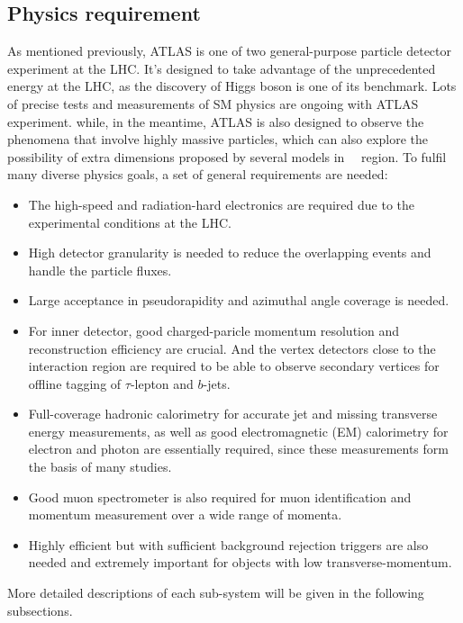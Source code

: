 \subsection{Physics requirement}

As mentioned previously, ATLAS is one of two general-purpose particle detector experiment at the LHC.
It's designed to take advantage of the unprecedented energy at the LHC, as the discovery of Higgs boson is one of its benchmark. 
Lots of precise tests and measurements of SM physics are ongoing with ATLAS experiment.
while, in the meantime, ATLAS is also designed to observe the phenomena that involve highly massive particles,
which can also explore the possibility of extra dimensions proposed by several models in~\tev~ region.
To fulfil many diverse physics goals, a set of general requirements are needed:
\begin{itemize}
	\item The high-speed and radiation-hard electronics are required due to the experimental conditions at the LHC. 
	\item High detector granularity is needed to reduce the overlapping events and handle the particle fluxes.
	\item Large acceptance in pseudorapidity and azimuthal angle coverage is needed.
	\item For inner detector, good charged-paricle momentum resolution and reconstruction efficiency are crucial. And the vertex detectors close to the interaction region are required to be able to observe secondary vertices for offline tagging of $\tau$-lepton and $b$-jets.
	\item Full-coverage hadronic calorimetry for accurate jet and missing transverse energy measurements, as well as good electromagnetic (EM) calorimetry for electron and photon are essentially required, since these measurements form the basis of many studies.
	\item Good muon spectrometer is also required for muon identification and momentum measurement over a wide range of momenta.
	\item Highly efficient but with sufficient background rejection triggers are also needed and extremely important for objects with low transverse-momentum. 
\end{itemize}

More detailed descriptions of each sub-system will be given in the following subsections.
